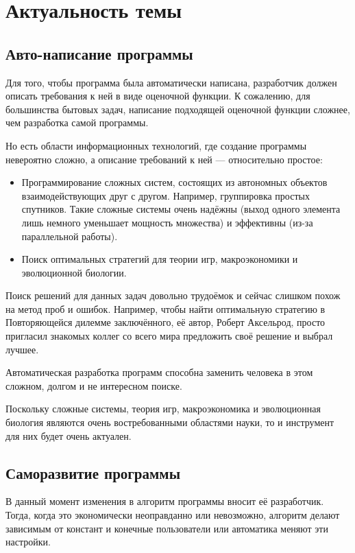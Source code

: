 \documentclass[a4paper,14pt]{extarticle}
\begin{document}
\tableofcontents

\newpage
\section{Актуальность темы}

\subsection{Авто-написание программы}
Для того, чтобы программа была автоматически написана, разработчик должен
описать требования к ней в виде оценочной функции. К сожалению, для большинства
бытовых задач, написание подходящей оценочной функции сложнее, чем
разработка самой программы.

Но есть области информационных технологий, где создание программы невероятно
сложно, а описание требований к ней — относительно простое:
\begin{itemize}
  \item Программирование сложных систем, состоящих из автономных объектов
        взаимодействующих друг с другом. Например, группировка простых
        спутников. Такие сложные системы очень надёжны (выход одного элемента
        лишь немного уменьшает мощность множества) и эффективны (из-за
        параллельной работы).
  \item Поиск оптимальных стратегий для теории игр, макроэкономики и
        эволюционной биологии.\cite{communication}
\end{itemize}

Поиск решений для данных задач довольно трудоёмок и сейчас слишком похож на
метод проб и ошибок. Например, чтобы найти оптимальную стратегию в Повторяющейся
дилемме заключённого, её автор, Роберт Аксельрод, просто пригласил знакомых
коллег со всего мира предложить своё решение и выбрал лучшее.\cite{dilemma}

Автоматическая разработка программ способна заменить человека в этом сложном,
долгом и не интересном поиске.

Поскольку сложные системы, теория игр, макроэкономика и эволюционная биология
являются очень востребованными областями науки, то и инструмент для них будет
очень актуален.

\subsection{Саморазвитие программы}
В данный момент изменения в алгоритм программы вносит её разработчик. Тогда,
когда это экономически неоправданно или невозможно, алгоритм делают зависимым
от констант и конечные пользователи или автоматика меняют эти настройки.
\end{document}
